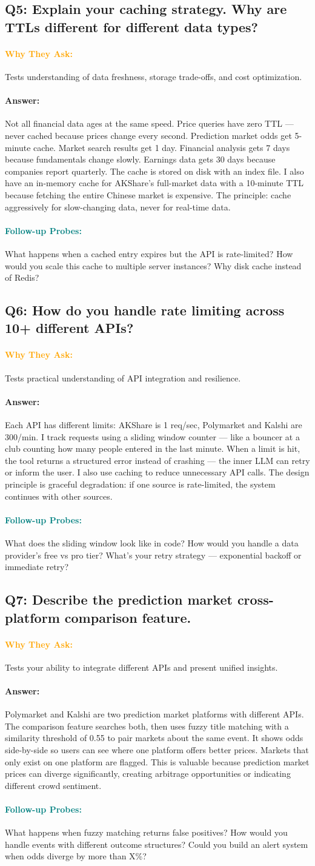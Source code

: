 \documentclass[11pt,a4paper]{article}
\newcommand{\Q}[1]{\subsection{#1}}
\newcommand{\Ans}[1]{\paragraph{\textbf{Answer:}} #1}
\newcommand{\Why}{\paragraph{\textcolor{orange}{\textbf{Why They Ask:}}}}
\newcommand{\Probe}{\paragraph{\textcolor{teal}{\textbf{Follow-up Probes:}}}}
\begin{document}
\Q{Q5: Explain your caching strategy. Why are TTLs different for different data types?}
\Why Tests understanding of data freshness, storage trade-offs, and cost optimization.
\Ans Not all financial data ages at the same speed. Price queries have zero TTL --- never cached because prices change every second. Prediction market odds get 5-minute cache. Market search results get 1 day. Financial analysis gets 7 days because fundamentals change slowly. Earnings data gets 30 days because companies report quarterly. The cache is stored on disk with an index file. I also have an in-memory cache for AKShare's full-market data with a 10-minute TTL because fetching the entire Chinese market is expensive. The principle: cache aggressively for slow-changing data, never for real-time data.
\Probe What happens when a cached entry expires but the API is rate-limited? How would you scale this cache to multiple server instances? Why disk cache instead of Redis?

\Q{Q6: How do you handle rate limiting across 10+ different APIs?}
\Why Tests practical understanding of API integration and resilience.
\Ans Each API has different limits: AKShare is 1 req/sec, Polymarket and Kalshi are 300/min. I track requests using a sliding window counter --- like a bouncer at a club counting how many people entered in the last minute. When a limit is hit, the tool returns a structured error instead of crashing --- the inner LLM can retry or inform the user. I also use caching to reduce unnecessary API calls. The design principle is graceful degradation: if one source is rate-limited, the system continues with other sources.
\Probe What does the sliding window look like in code? How would you handle a data provider's free vs pro tier? What's your retry strategy --- exponential backoff or immediate retry?

\Q{Q7: Describe the prediction market cross-platform comparison feature.}
\Why Tests your ability to integrate different APIs and present unified insights.
\Ans Polymarket and Kalshi are two prediction market platforms with different APIs. The comparison feature searches both, then uses fuzzy title matching with a similarity threshold of 0.55 to pair markets about the same event. It shows odds side-by-side so users can see where one platform offers better prices. Markets that only exist on one platform are flagged. This is valuable because prediction market prices can diverge significantly, creating arbitrage opportunities or indicating different crowd sentiment.
\Probe What happens when fuzzy matching returns false positives? How would you handle events with different outcome structures? Could you build an alert system when odds diverge by more than X\%?
\end{document}
